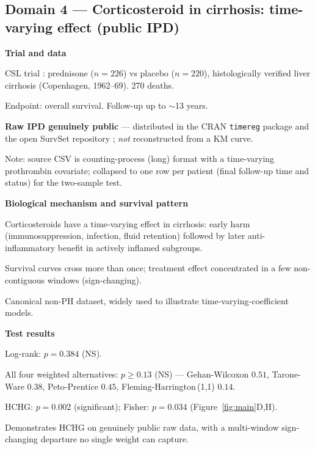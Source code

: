 \documentclass[unnumsec,webpdf,contemporary,large]{oup-authoring-template}
\let\origitemize\itemize
\let\origenditemize\enditemize
\renewenvironment{itemize}{%
  \origitemize
  \setlength{\itemsep}{1pt}%
  \setlength{\parskip}{0pt}%
  \setlength{\topsep}{3pt}%
}{\origenditemize}
\begin{document}
\subsection*{Domain 4 — Corticosteroid in cirrhosis: time-varying effect
  (public IPD)}

\textbf{Trial and data}
\begin{itemize}
  \item CSL trial \citep{csl_data}: prednisone ($n=226$) vs placebo
        ($n=220$), histologically verified liver cirrhosis
        (Copenhagen, 1962--69). 270 deaths.
  \item Endpoint: overall survival. Follow-up up to $\sim$13 years.
  \item \textbf{Raw IPD genuinely public} --- distributed in the CRAN
        \texttt{timereg} package and the open SurvSet repository
        \citep{survset2022}; \emph{not} reconstructed from a KM curve.
  \item Note: source CSV is counting-process (long) format with a
        time-varying prothrombin covariate; collapsed to one row per
        patient (final follow-up time and status) for the two-sample test.
\end{itemize}

\textbf{Biological mechanism and survival pattern}
\begin{itemize}
  \item Corticosteroids have a time-varying effect in cirrhosis: early
        harm (immunosuppression, infection, fluid retention) followed by
        later anti-inflammatory benefit in actively inflamed subgroups.
  \item Survival curves cross more than once; treatment effect concentrated
        in a few non-contiguous windows (sign-changing).
  \item Canonical non-PH dataset, widely used to illustrate
        time-varying-coefficient models.
\end{itemize}

\textbf{Test results}
\begin{itemize}
  \item Log-rank: $p = 0.384$ (NS).
  \item All four weighted alternatives: $p \geq 0.13$ (NS) —
        Gehan-Wilcoxon $0.51$, Tarone-Ware $0.38$, Peto-Prentice $0.45$,
        Fleming-Harrington\,(1,1) $0.14$.
  \item HCHG: $p = 0.002$ (significant); Fisher: $p = 0.034$
        (Figure~\ref{fig:main}D,H).
  \item Demonstrates HCHG on genuinely public raw data, with a multi-window
        sign-changing departure no single weight can capture.
\end{itemize}
\end{document}
